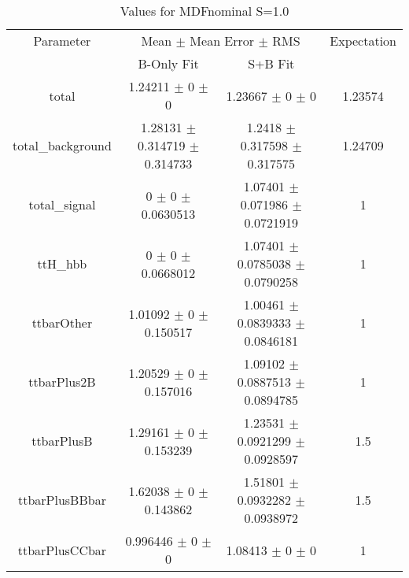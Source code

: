 \begin{table}
\centering
\caption{Values for MDFnominal S=1.0}
\begin{tabular}{cccc}
\toprule
Parameter & \multicolumn{2}{c}{Mean $\pm$ Mean Error $\pm$ RMS} & Expectation\\
 & B-Only Fit & S+B Fit & \\
\midrule
total & \num{1.24211} $\pm$ \num{0} $\pm$ \num{0} & \num{1.23667} $\pm$ \num{0} $\pm$ \num{0} & \num{1.23574}\\
total\_background & \num{1.28131} $\pm$ \num{0.314719} $\pm$ \num{0.314733} & \num{1.2418} $\pm$ \num{0.317598} $\pm$ \num{0.317575} & \num{1.24709}\\
total\_signal & \num{0} $\pm$ \num{0} $\pm$ \num{0.0630513} & \num{1.07401} $\pm$ \num{0.071986} $\pm$ \num{0.0721919} & \num{1}\\
ttH\_hbb & \num{0} $\pm$ \num{0} $\pm$ \num{0.0668012} & \num{1.07401} $\pm$ \num{0.0785038} $\pm$ \num{0.0790258} & \num{1}\\
ttbarOther & \num{1.01092} $\pm$ \num{0} $\pm$ \num{0.150517} & \num{1.00461} $\pm$ \num{0.0839333} $\pm$ \num{0.0846181} & \num{1}\\
ttbarPlus2B & \num{1.20529} $\pm$ \num{0} $\pm$ \num{0.157016} & \num{1.09102} $\pm$ \num{0.0887513} $\pm$ \num{0.0894785} & \num{1}\\
ttbarPlusB & \num{1.29161} $\pm$ \num{0} $\pm$ \num{0.153239} & \num{1.23531} $\pm$ \num{0.0921299} $\pm$ \num{0.0928597} & \num{1.5}\\
ttbarPlusBBbar & \num{1.62038} $\pm$ \num{0} $\pm$ \num{0.143862} & \num{1.51801} $\pm$ \num{0.0932282} $\pm$ \num{0.0938972} & \num{1.5}\\
ttbarPlusCCbar & \num{0.996446} $\pm$ \num{0} $\pm$ \num{0} & \num{1.08413} $\pm$ \num{0} $\pm$ \num{0} & \num{1}\\
\bottomrule
\end{tabular}
\end{table}